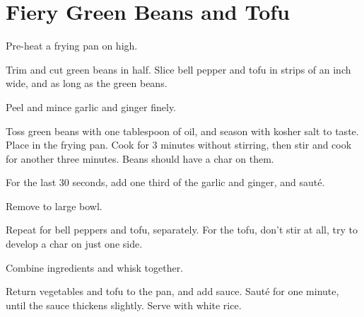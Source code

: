 \section{Fiery Green Beans and Tofu}
\begin{recipe}


Pre-heat a frying pan on high.


Trim and cut green beans in half. Slice bell pepper and tofu in strips
 of an inch wide, and as long as the green beans.


Peel and mince garlic and ginger finely.


Toss green beans with one tablespoon of oil, and season with kosher salt to taste. Place in
the frying pan. Cook for 3 minutes without stirring, then stir and cook for another
three minutes. Beans should have a char on them.

For the last 30 seconds, add one third of the garlic and ginger, and sauté.

Remove to large bowl.

Repeat for bell peppers and tofu, separately. For the tofu, don't stir at all,
try to develop a char on just one side.


Combine ingredients and whisk together.

Return vegetables and tofu to the pan, and add sauce. Sauté for one minute,
until the sauce thickens slightly. Serve with white rice.

\end{recipe}
